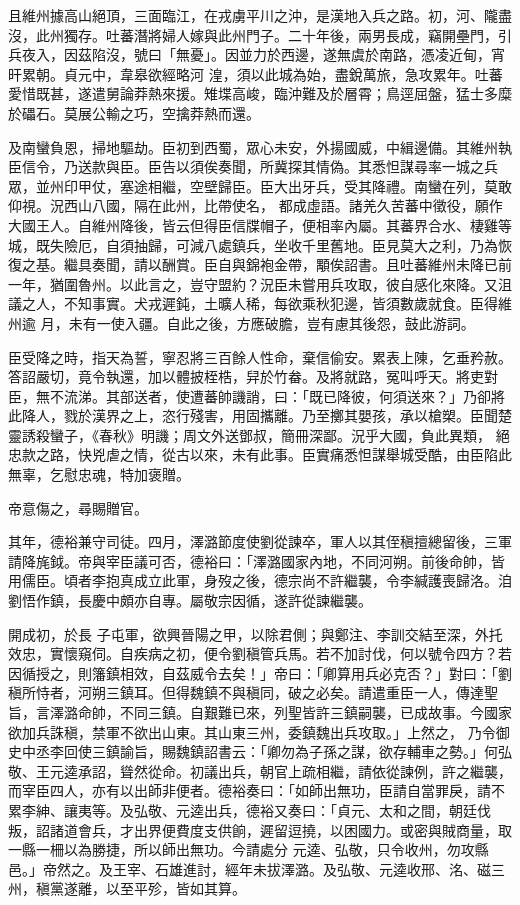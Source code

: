 \begin{pinyinscope}
 且維州據高山絕頂，三面臨江，在戎虜平川之沖，是漢地入兵之路。初，河、隴盡沒，此州獨存。吐蕃潛將婦人嫁與此州門子。二十年後，兩男長成，竊開壘門，引兵夜入，因茲陷沒，號曰「無憂」。因並力於西邊，遂無虞於南路，憑凌近甸，宵旰累朝。貞元中，韋皋欲經略河
 湟，須以此城為始，盡銳萬旅，急攻累年。吐蕃愛惜既甚，遂遣舅論莽熱來援。雉堞高峻，臨沖難及於層霄；鳥逕屈盤，猛士多糜於礧石。莫展公輸之巧，空擒莽熱而還。



 及南蠻負恩，掃地驅劫。臣初到西蜀，眾心未安，外揚國威，中緝邊備。其維州執臣信令，乃送款與臣。臣告以須俟奏聞，所冀探其情偽。其悉怛謀尋率一城之兵眾，並州印甲仗，塞途相繼，空壁歸臣。臣大出牙兵，受其降禮。南蠻在列，莫敢仰視。況西山八國，隔在此州，比帶使名，
 都成虛語。諸羌久苦蕃中徵役，願作大國王人。自維州降後，皆云但得臣信牒帽子，便相率內屬。其蕃界合水、棲雞等城，既失險厄，自須抽歸，可減八處鎮兵，坐收千里舊地。臣見莫大之利，乃為恢復之基。繼具奏聞，請以酬賞。臣自與錦袍金帶，顒俟詔書。且吐蕃維州未降已前一年，猶圍魯州。以此言之，豈守盟約？況臣未嘗用兵攻取，彼自感化來降。又沮議之人，不知事實。犬戎遲鈍，土曠人稀，每欲乘秋犯邊，皆須數歲就食。臣得維州逾
 月，未有一使入疆。自此之後，方應破膽，豈有慮其後怨，鼓此游詞。



 臣受降之時，指天為誓，寧忍將三百餘人性命，棄信偷安。累表上陳，乞垂矜赦。答詔嚴切，竟令執還，加以體披桎梏，舁於竹畚。及將就路，冤叫呼天。將吏對臣，無不流涕。其部送者，使遭蕃帥譏誚，曰：「既已降彼，何須送來？」乃卻將此降人，戮於漢界之上，恣行殘害，用固攜離。乃至擲其嬰孩，承以槍槊。臣聞楚靈誘殺蠻子，《春秋》明譏；周文外送鄧叔，簡冊深鄙。況乎大國，負此異類，
 絕忠款之路，快兇虐之情，從古以來，未有此事。臣實痛悉怛謀舉城受酷，由臣陷此無辜，乞慰忠魂，特加褒贈。



 帝意傷之，尋賜贈官。



 其年，德裕兼守司徒。四月，澤潞節度使劉從諫卒，軍人以其侄稹擅總留後，三軍請降旄鉞。帝與宰臣議可否，德裕曰：「澤潞國家內地，不同河朔。前後命帥，皆用儒臣。頃者李抱真成立此軍，身歿之後，德宗尚不許繼襲，令李緘護喪歸洛。洎劉悟作鎮，長慶中頗亦自專。屬敬宗因循，遂許從諫繼襲。



 開成初，於長
 子屯軍，欲興晉陽之甲，以除君側；與鄭注、李訓交結至深，外托效忠，實懷窺伺。自疾病之初，便令劉稹管兵馬。若不加討伐，何以號令四方？若因循授之，則籓鎮相效，自茲威令去矣！」帝曰：「卿算用兵必克否？」對曰：「劉稹所恃者，河朔三鎮耳。但得魏鎮不與稹同，破之必矣。請遣重臣一人，傳達聖旨，言澤潞命帥，不同三鎮。自艱難已來，列聖皆許三鎮嗣襲，已成故事。今國家欲加兵誅稹，禁軍不欲出山東。其山東三州，委鎮魏出兵攻取。」上然之，
 乃令御史中丞李回使三鎮諭旨，賜魏鎮詔書云：「卿勿為子孫之謀，欲存輔車之勢。」何弘敬、王元逵承詔，聳然從命。初議出兵，朝官上疏相繼，請依從諫例，許之繼襲，而宰臣四人，亦有以出師非便者。德裕奏曰：「如師出無功，臣請自當罪戾，請不累李紳、讓夷等。及弘敬、元逵出兵，德裕又奏曰：「貞元、太和之間，朝廷伐叛，詔諸道會兵，才出界便費度支供餉，遲留逗撓，以困國力。或密與賊商量，取一縣一柵以為勝捷，所以師出無功。今請處分
 元逵、弘敬，只令收州，勿攻縣邑。」帝然之。及王宰、石雄進討，經年未拔澤潞。及弘敬、元逵收邢、洺、磁三州，稹黨遂離，以至平殄，皆如其算。




\end{pinyinscope}
